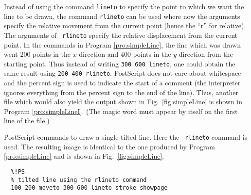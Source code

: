 Instead of using the command {\tt lineto} to specify the point to
which we want the line to be drawn, the command {\tt rlineto} can be
used where now the arguments specify the relative movement from the
current point (hence the ``r'' for relative).  The arguments of {\tt
rlineto} specify the relative displacement from the current point.  In
the commands in Program \ref{pro:simpleLine}, the line which was drawn
went $200$ points in the $x$ direction and $400$ points in the $y$
direction from the starting point.  Thus instead of writing {\tt 300
600 lineto}, one could obtain the same result using {\tt 200 400
rlineto}.  PostScript does not care about whitespace and the percent
sign is used to indicate the start of a comment (the interpreter
ignores everything from the percent sign to the end of the line).
Thus, another file which would also yield the output shown in Fig.\
\ref{fig:simpleLine} is shown in Program \ref{pro:simpleLineI}.
(The magic word must appear by itself on the first line of the file.)
\begin{program}
PostScript commands to draw a single tilted line.  Here the {\tt
rlineto} command is used.  The resulting image is identical to the one
produced by Program \ref{pro:simpleLine} and is shown in Fig.\
\ref{fig:simpleLine}.  \label{pro:simpleLineI}
\codemiddle
\begin{verbatim}
  %!PS
  % tilted line using the rlineto command
  100 200 moveto 300 600 lineto stroke showpage
\end{verbatim}
\end{program}

